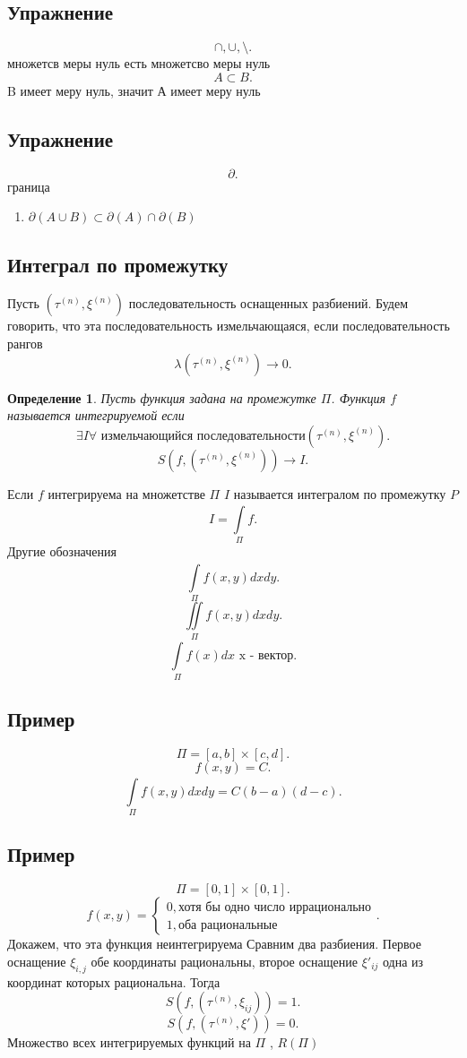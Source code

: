 \documentclass[14pt]{extarticle} \usepackage{fontspec}
\newtheorem{definition}{Определение}
\begin{document}
\subsection{Упражнение}
\[
\cap,\cup,\setminus
.\] 
множетсв меры нуль есть множетсво меры нуль
\[
A \subset B
.\] 
B имеет меру нуль, значит А имеет меру нуль
\subsection{Упражнение}
\[
\partial 
.\] 
граница
\begin{enumerate}
    \item $\partial(A \cup B) \subset \partial(A) \cap \partial(B)$
\end{enumerate}
\subsection{Интеграл по промежутку}
Пусть $(\tau^{(n)},\xi^{(n)})$ последовательность оснащенных разбиений.
Будем говорить, что эта последовательность измельчающаяся, если последовательность рангов 
\[
\lambda(\tau^{(n)},\xi^{(n)}) \to 0
.\] 
\begin{definition}
Пусть функция задана на промежутке $\Pi$. Функция  $f$ называется интегрируемой если
\[
    \exists  I \forall \text{~измельчающийся последовательности} (\tau^{(n)},\xi^{(n)})
.\] 
\[
S(f,(\tau^{(n)},\xi^{(n)})) \to I
.\] 
\end{definition}
Если $f$ интегрируема на множетстве  $\Pi$  $I$ называется интегралом по промежутку  $P$
 \[
I = \int\limits_{\Pi}^{} f 
.\] 
Другие обозначения
\[
\int\limits_{\Pi}^{} f(x,y)  dx dy
.\] 
\[
\iint\limits_{\Pi} f(x,y) dx dy
.\] 
\[
    \int\limits_{\Pi}^{} f(x) dx \text{~x - вектор} 
.\] 
\subsection{Пример}
\[
    \Pi = [a,b] \times [c,d]
.\] 
\[
f(x,y) = C
.\] 
\[
\int\limits_{\Pi}^{}  f(x,y) dxdy = C(b-a)(d-c)
.\] 
\subsection{Пример}
\[
    \Pi = [0,1] \times [0,1]
.\] 
\[
f(x,y) =
\begin{cases}
    0, \text{хотя бы одно число иррационально}\\
    1, \text{оба рациональные}
\end{cases}
.\] 
Докажем, что эта функция неинтегрируема
Сравним два разбиения. Первое оснащение $\xi_{i,j}$ обе координаты рациональны,
второе оснащение $\xi'_{ij}$ одна из координат которых рациональна. Тогда
\[
S(f,(\tau^{(n)},\xi_{ij})) = 1
.\] 
\[
S(f,(\tau^{(n)},\xi')) = 0
.\] 
Множество всех интегрируемых функций на $\Pi$ ,  $R(\Pi)$
\end{document}
